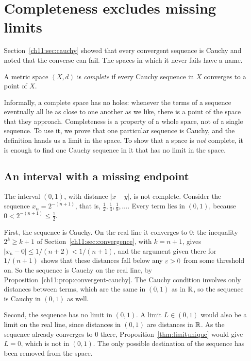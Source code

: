 \section{Completeness excludes missing limits}\label{ch11:sec:complete}
Section~\ref{ch11:sec:cauchy} showed that every convergent sequence is Cauchy and noted that the converse can fail. The spaces in which it never fails have a name.
\par\noindent\begin{minipage}{\linewidth}
\begin{definition}\label{ch11:def:complete}
A metric space $(X,d)$ is \emph{complete} if every Cauchy sequence in $X$ converges to a point of $X$.
\end{definition}
\end{minipage}\par

Informally, a complete space has no holes: whenever the terms of a sequence eventually all lie as close to one another as we like, there is a point of the space that they approach. Completeness is a property of a whole space, not of a single sequence. To use it, we prove that one particular sequence is Cauchy, and the definition hands us a limit in the space. To show that a space is \emph{not} complete, it is enough to find one Cauchy sequence in it that has no limit in the space.

\subsection*{An interval with a missing endpoint}
The interval $(0,1)$, with distance $|x-y|$, is not complete. Consider the sequence $x_n=2^{-(n+1)}$, that is, $\tfrac12,\tfrac14,\tfrac18,\ldots$. Every term lies in $(0,1)$, because $0<2^{-(n+1)}\le\tfrac12$.

First, the sequence is Cauchy. On the real line it converges to $0$: the inequality $2^k\ge k+1$ of Section~\ref{ch11:sec:convergence}, with $k=n+1$, gives $|x_n-0|\le1/(n+2)<1/(n+1)$, and the argument given there for $1/(n+1)$ shows that these distances fall below any $\varepsilon>0$ from some threshold on. So the sequence is Cauchy on the real line, by Proposition~\ref{ch11:prop:convergent-cauchy}. The Cauchy condition involves only distances between terms, which are the same in $(0,1)$ as in $\mathbb R$, so the sequence is Cauchy in $(0,1)$ as well.

Second, the sequence has no limit in $(0,1)$. A limit $L\in(0,1)$ would also be a limit on the real line, since distances in $(0,1)$ are distances in $\mathbb R$. As the sequence already converges to $0$ there, Proposition~\ref{thm:limitunique} would give $L=0$, which is not in $(0,1)$. The only possible destination of the sequence has been removed from the space.

